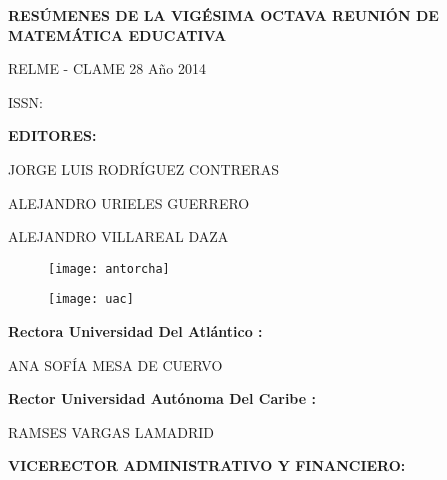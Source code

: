 \documentclass[twocolumn,twocolumn,balance,spanish,svgnames,x11names,x11names,HTML]{book}
\begin{document}
\frontmatter

\pagestyle{empty}
\pagecolor{ptcbackground}
 \vfill
\onecolumn
{\color{white}
\bfseries \setlength\parindent{0pt}


\begin{mdframed}[backgroundcolor=ptctitle,hidealllines=true]
\parbox[t]{\dimexpr\textwidth-2\fboxsep\relax}{  \color{white}\bfseries\sffamily  \uppercase{Res\'umenes de la vig\'esima octava reuni\'on de matem\'atica educativa} }
\end{mdframed}

RELME - CLAME 28 Año 2014

ISSN:\vfill

\colorbox{ptctitle}{\color{white}\bfseries\sffamily EDITORES:}

JORGE LUIS RODRÍGUEZ CONTRERAS

ALEJANDRO URIELES GUERRERO

ALEJANDRO VILLAREAL DAZA

\vfill

 \begin{multicols}{2} 

\begin{figure}[H]
\centering\texttt{[image: antorcha]}
\end{figure}
 
\begin{figure}[H]
\centering\texttt{[image: uac]}
\end{figure}


 \end{multicols} 

\vfill

 \begin{multicols}{2} 

\colorbox{ptctitle}{\color{white}\bfseries\sffamily Rectora Universidad Del Atlántico :}

ANA SOFÍA MESA DE CUERVO

\colorbox{ptctitle}{\color{white}\bfseries\sffamily Rector Universidad Autónoma Del Caribe :}

\uppercase{ Ramses Vargas Lamadrid}

 \end{multicols} 

\vfill

\colorbox{ptctitle}{\color{white}\bfseries\sffamily VICERECTOR ADMINISTRATIVO Y FINANCIERO:}

}
\end{document}
